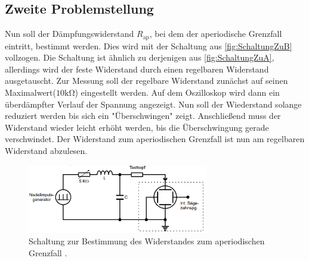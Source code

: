 \subsection{Zweite Problemstellung}
Nun soll der Dämpfungswiderstand $R_{\text{ap}}$, bei dem der aperiodische Grenzfall eintritt, bestimmt werden. Dies wird mit der Schaltung aus \autoref{fig:SchaltungZuB} vollzogen. 
Die Schaltung ist ähnlich zu derjenigen aus \autoref{fig:SchaltungZuA}, allerdings wird der feste Widerstand durch einen regelbaren Widerstand ausgetauscht. Zur Messung 
soll der regelbare Widerstand zunächst auf seinen Maximalwert($10\unit{\kilo\ohm}$) eingestellt werden. Auf dem Oszilloskop wird dann ein überdämpfter Verlauf der Spannung angezeigt.
Nun soll der Wiederstand solange reduziert werden bis sich ein "Überschwingen" zeigt. Anschließend muss der Widerstand wieder leicht erhöht werden, bis die Überschwingung gerade 
verschwindet. Der Widerstand zum aperiodischen Grenzfall ist nun am regelbaren Widerstand abzulesen.
\begin{figure}
    \centering
    \includegraphics[width=0.7\textwidth]{content/SchaltungZuB.pdf}
    \caption{Schaltung zur Bestimmung des Widerstandes zum aperiodischen Grenzfall \cite{v354}.}    
    \label{fig:SchaltungZuB}
\end{figure}
